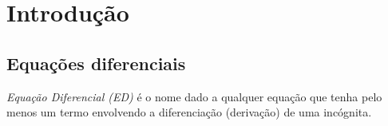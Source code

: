 
\chapter{Introdução}\label{cap_intro}
\thispagestyle{fancy}

\section{Equações diferenciais}\label{cap_intro_sec_ed}

\emph{Equação Diferencial (ED)} é o nome dado a qualquer equação que tenha pelo menos um termo envolvendo a diferenciação (derivação) de uma incógnita.

